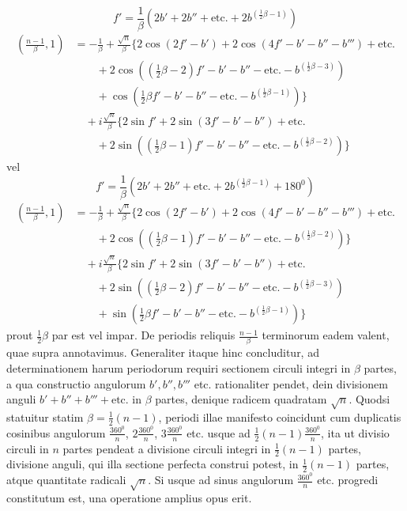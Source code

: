\[
f'=\frac1\beta(2b'+2b''+\text{etc.}+2b^{(\frac12\beta-1)})
\]
\[
\begin{aligned}
\left(\frac{n-1}\beta,1\right)&=-\frac1\beta+\frac{\surd n}\beta\{2\cos(2f'-b')+2\cos(4f'-b'-b''-b''')+\text{etc.}\\
&\qquad+2\cos((\tfrac12\beta-2)f'-b'-b''-\text{etc.}-b^{(\frac12\beta-3)})\\
&\qquad+\cos(\tfrac12\beta f'-b'-b''-\text{etc.}-b^{(\frac12\beta-1)})\}\\
&\quad+i\frac{\surd n}\beta\{2\sin f'+2\sin(3f'-b'-b'')+\text{etc.}\\
&\qquad+2\sin((\tfrac12\beta-1)f'-b'-b''-\text{etc.}-b^{(\frac12\beta-2)})\}
\end{aligned}
\]
vel
\[
f'=\frac1\beta(2b'+2b''+\text{etc.}+2b^{(\frac12\beta-1)}+180^0)
\]
\[
\begin{aligned}
\left(\frac{n-1}\beta,1\right)&=-\frac1\beta+\frac{\surd n}\beta\{2\cos(2f'-b')+2\cos(4f'-b'-b''-b''')+\text{etc.}\\
&\qquad+2\cos((\tfrac12\beta-1)f'-b'-b''-\text{etc.}-b^{(\frac12\beta-2)})\}\\
&\quad+i\frac{\surd n}\beta\{2\sin f'+2\sin(3f'-b'-b'')+\text{etc.}\\
&\qquad+2\sin((\tfrac12\beta-2)f'-b'-b''-\text{etc.}-b^{(\frac12\beta-3)})\\
&\qquad+\sin(\tfrac12\beta f'-b'-b''-\text{etc.}-b^{(\frac12\beta-1)})\}
\end{aligned}
\]
prout $\frac12\beta$ par est vel impar. De periodis reliquis $\frac{n-1}\beta$ terminorum eadem valent, quae supra annotavimus. Generaliter itaque hinc concluditur, ad determinationem harum periodorum requiri sectionem circuli integri in $\beta$ partes, a qua
%
constructio angulorum $b',b'',b'''$ etc. rationaliter pendet, dein divisionem anguli $b'+b''+b'''+\text{etc.}$ in $\beta$ partes, denique radicem quadratam $\surd n$. Quodsi statuitur statim $\beta=\frac12(n-1)$, periodi illae manifesto coincidunt cum duplicatis cosinibus angulorum $\frac{360^0}n$, $2\frac{360^0}n$, $3\frac{360^0}n$ etc. usque ad $\frac12(n-1)\frac{360^0}n$, ita ut divisio circuli in $n$ partes pendeat a divisione circuli integri in $\frac12(n-1)$ partes, divisione anguli, qui illa sectione perfecta construi potest, in $\frac12(n-1)$ partes, atque quantitate radicali $\surd n$. Si usque ad sinus angulorum $\frac{360^0}n$ etc. progredi constitutum est, una operatione amplius opus erit.

